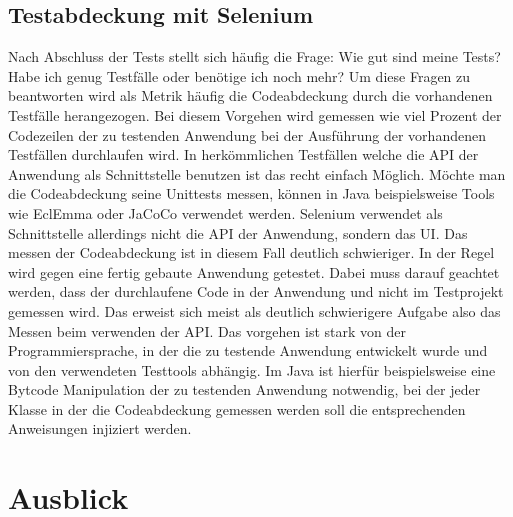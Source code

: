 \section{Testabdeckung mit Selenium}
\label{sec:testdurchführung_mit_selenium}

Nach Abschluss der Tests stellt sich häufig die Frage: Wie gut sind meine Tests? Habe ich genug Testfälle oder benötige ich noch mehr? Um diese Fragen zu beantworten wird als Metrik häufig die Codeabdeckung durch die vorhandenen Testfälle herangezogen. Bei diesem Vorgehen wird gemessen wie viel Prozent der Codezeilen der zu testenden Anwendung bei der Ausführung der vorhandenen Testfällen durchlaufen wird.
In herkömmlichen Testfällen welche die API der Anwendung als Schnittstelle benutzen ist das recht einfach Möglich. Möchte man die Codeabdeckung seine Unittests messen, können in Java beispielsweise Tools wie EclEmma oder JaCoCo verwendet werden. Selenium verwendet als Schnittstelle allerdings nicht die API der Anwendung, sondern das UI. Das messen der Codeabdeckung ist in diesem Fall deutlich schwieriger. In der Regel wird gegen eine fertig gebaute Anwendung getestet. Dabei muss darauf geachtet werden, dass der durchlaufene Code in der Anwendung und nicht im Testprojekt gemessen wird.
Das erweist sich meist als deutlich schwierigere Aufgabe also das Messen beim verwenden der API. Das vorgehen ist stark von der Programmiersprache, in der die zu testende Anwendung entwickelt wurde und von den verwendeten Testtools abhängig. Im Java ist hierfür beispielsweise eine Bytcode Manipulation der zu testenden Anwendung notwendig, bei der jeder Klasse in der die Codeabdeckung gemessen werden soll die entsprechenden Anweisungen injiziert werden.


\chapter{Ausblick}
\label{sec:ausblick}

